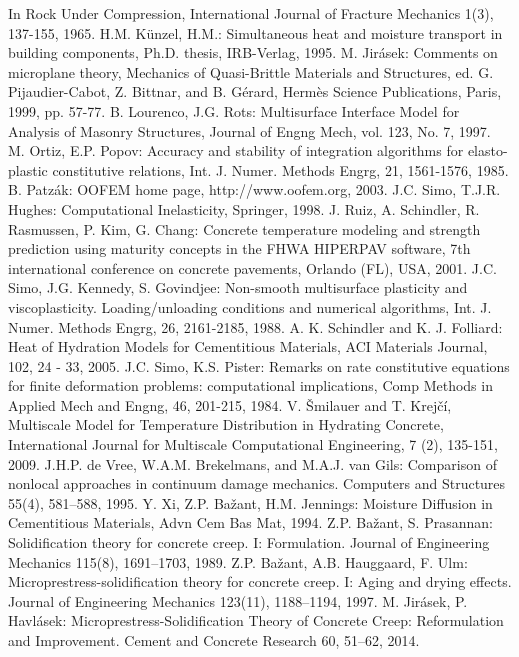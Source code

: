 \documentclass[a4paper]{article}
\begin{document}
\begin{thebibliography}{99}
In Rock Under Compression, International Journal of Fracture Mechanics
1(3), 137-155, 1965.
 H.M. K{\"u}nzel, H.M.: Simultaneous heat and
  moisture transport in building components, Ph.D. thesis, IRB-Verlag,
  1995.
 M. Jir\'{a}sek: Comments on microplane theory, Mechanics of Quasi-Brittle Materials and Structures, ed. G. Pijaudier-Cabot, Z. Bittnar, and B. G\'{e}rard, Herm\`{e}s Science Publications, Paris, 1999, pp. 57-77.
 B. Lourenco, J.G. Rots: Multisurface Interface Model for Analysis of Masonry Structures, Journal of Engng Mech, vol. 123, No. 7, 1997.
 M. Ortiz, E.P. Popov: Accuracy and stability of integration algorithms for elasto-plastic constitutive relations, Int. J. Numer. Methods Engrg, 21, 1561-1576, 1985.
 B. Patz\'ak: OOFEM home page, http://www.oofem.org, 2003.
 J.C. Simo, T.J.R. Hughes: Computational Inelasticity, Springer, 1998.
 J. Ruiz, A. Schindler, R. Rasmussen, P. Kim, G. Chang: Concrete temperature modeling and strength prediction using maturity concepts in the FHWA HIPERPAV software, 7th international conference on concrete pavements, Orlando (FL), USA, 2001.
 J.C. Simo, J.G. Kennedy, S. Govindjee: Non-smooth multisurface plasticity and viscoplasticity. Loading/unloading conditions and numerical algorithms, Int. J. Numer. Methods Engrg, 26, 2161-2185, 1988.
 A. K. Schindler and K. J. Folliard: Heat of Hydration Models for Cementitious Materials, ACI Materials Journal, 102, 24 - 33, 2005.
 J.C. Simo, K.S. Pister: Remarks on rate constitutive equations for finite deformation problems: computational implications, Comp Methods in Applied Mech and Engng, 46, 201-215, 1984.
 V. \v{S}milauer and T. Krej\v{c}\'i, Multiscale
  Model for Temperature Distribution in Hydrating Concrete,
  International Journal for Multiscale Computational Engineering, 7
  (2), 135-151, 2009.
 J.H.P. de Vree, W.A.M. Brekelmans, and M.A.J. van Gils: Comparison of nonlocal approaches in continuum damage mechanics. Computers and Structures 55(4), 581–588, 1995.
 Y. Xi, Z.P. Ba\v{z}ant, H.M. Jennings: Moisture Diffusion
  in Cementitious Materials, Advn Cem Bas Mat, 1994.
 Z.P. Ba\v{z}ant, S. Prasannan: Solidification theory for concrete creep. {I}: Formulation. Journal of Engineering Mechanics 115(8), 1691–1703, 1989.
 Z.P. Ba\v{z}ant, A.B. Hauggaard, F. Ulm: Microprestress-solidification theory for concrete creep. {I}: Aging and drying effects. Journal of Engineering Mechanics 123(11), 1188–1194, 1997.
 M. Jir\'{a}sek, P. Havl\'{a}sek: Microprestress-Solidification Theory of Concrete Creep: Reformulation and Improvement. Cement and Concrete Research 60, 51–62, 2014.


\end{thebibliography}
\end{document}
